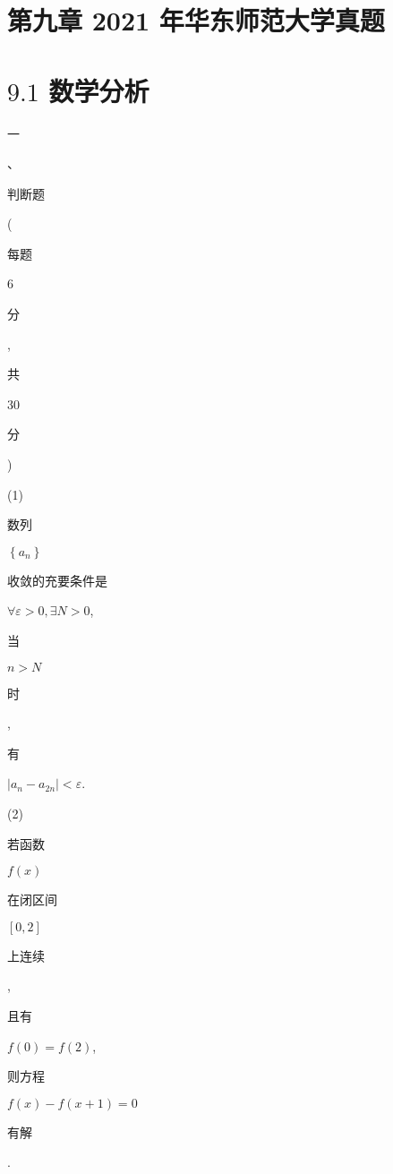 \documentclass[10pt]{article}
\begin{document}
\section{第九章 2021 年华东师范大学真题}
\section{$9.1$ 数学分析}
\begin{CJK}{UTF8}{mj}一\end{CJK}、\begin{CJK}{UTF8}{mj}判断题\end{CJK} (\begin{CJK}{UTF8}{mj}每题\end{CJK} 6 \begin{CJK}{UTF8}{mj}分\end{CJK}, \begin{CJK}{UTF8}{mj}共\end{CJK} 30 \begin{CJK}{UTF8}{mj}分\end{CJK})

(1) \begin{CJK}{UTF8}{mj}数列\end{CJK} $\left\{a_{n}\right\}$ \begin{CJK}{UTF8}{mj}收敛的充要条件是\end{CJK} $\forall \varepsilon>0, \exists N>0$, \begin{CJK}{UTF8}{mj}当\end{CJK} $n>N$ \begin{CJK}{UTF8}{mj}时\end{CJK}, \begin{CJK}{UTF8}{mj}有\end{CJK} $\left|a_{n}-a_{2 n}\right|<\varepsilon$.

(2) \begin{CJK}{UTF8}{mj}若函数\end{CJK} $f(x)$ \begin{CJK}{UTF8}{mj}在闭区间\end{CJK} $[0,2]$ \begin{CJK}{UTF8}{mj}上连续\end{CJK}, \begin{CJK}{UTF8}{mj}且有\end{CJK} $f(0)=f(2)$, \begin{CJK}{UTF8}{mj}则方程\end{CJK} $f(x)-f(x+1)=0$ \begin{CJK}{UTF8}{mj}有解\end{CJK}.
\end{document}
